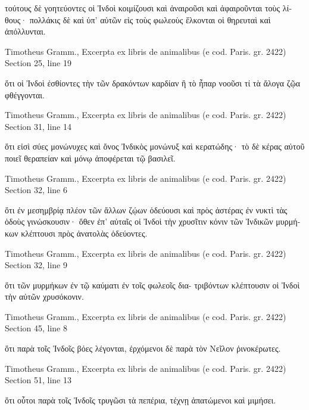\documentclass[12pt,letterpaper,twoside,final]{memoir}
\begin{document}
\begin{greek}
             τούτους δὲ γοητεύοντες οἱ Ἰνδοὶ κοιμίζουσι 
καὶ ἀναιροῦσι καὶ ἀφαιροῦνται τοὺς λίθους· πολλάκις δὲ 
καὶ ὑπ' αὐτῶν εἰς τοὺς φωλεοὺς ἕλκονται οἱ θηρευταὶ καὶ 
ἀπόλλυνται. 



Timotheus Gramm., Excerpta ex libris de animalibus (e cod. Paris. gr. 2422) 
Section 25, line 19

ὅτι οἱ Ἰνδοὶ ἐσθίοντες τὴν τῶν δρακόντων καρδίαν ἢ 
τὸ ἧπαρ νοοῦσι τί τὰ ἄλογα ζῷα φθέγγονται. 



Timotheus Gramm., Excerpta ex libris de animalibus (e cod. Paris. gr. 2422) 
Section 31, line 14

ὅτι εἰσὶ σύες μονώνυχες καὶ ὄνος Ἰνδικὸς μονώνυξ καὶ 
κερατώδης· τὸ δὲ κέρας αὐτοῦ ποιεῖ θεραπείαν καὶ μόνῳ 
ἀποφέρεται τῷ βασιλεῖ. 



Timotheus Gramm., Excerpta ex libris de animalibus (e cod. Paris. gr. 2422) 
Section 32, line 6

ὅτι ἐν μεσημβρίᾳ πλέον τῶν ἄλλων ζῴων ὁδεύουσι καὶ 
πρὸς ἀστέρας ἐν νυκτὶ τὰς ὁδοὺς γινώσκουσιν· ὅθεν ἐπ' 
αὐταῖς οἱ Ἰνδοὶ τὴν χρυσῖτιν κόνιν τῶν Ἰνδικῶν μυρμήκων 
κλέπτουσι πρὸς ἀνατολὰς ὁδεύοντες. 



Timotheus Gramm., Excerpta ex libris de animalibus (e cod. Paris. gr. 2422) 
Section 32, line 9

ὅτι τῶν μυρμήκων ἐν τῷ καύματι ἐν τοῖς φωλεοῖς δια-
τριβόντων κλέπτουσιν οἱ Ἰνδοὶ τὴν αὐτῶν χρυσόκονιν. 



Timotheus Gramm., Excerpta ex libris de animalibus (e cod. Paris. gr. 2422) 
Section 45, line 8

ὅτι παρὰ τοῖς Ἰνδοῖς βόες λέγονται, ἐρχόμενοι δὲ παρὰ 
τὸν Νεῖλον ῥινοκέρωτες. 



Timotheus Gramm., Excerpta ex libris de animalibus (e cod. Paris. gr. 2422) 
Section 51, line 13

ὅτι οὗτοι παρὰ τοῖς Ἰνδοῖς τρυγῶσι τὰ πεπέρια, τέχνῃ 
ἀπατώμενοι καὶ μιμήσει. 

\end{greek}
\end{document}
